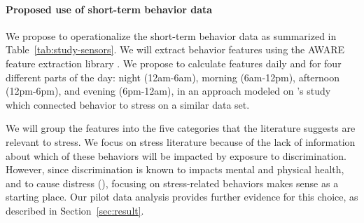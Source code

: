 \paragraph{Proposed use of short-term behavior data} We propose to operationalize the short-term behavior data as summarized in Table~\ref{tab:study-sensors}.  We will extract behavior features using  the AWARE feature extraction library \citep{Chikersal:2019}. We propose to calculate features daily and for four different parts of the day: night (12am-6am), morning (6am-12pm), afternoon (12pm-6pm), and evening (6pm-12am), in an approach modeled on \citep{wang2014studentlife}'s study which connected behavior to stress on a similar data set. 

We will group the features into  the five categories that the literature suggests are relevant to stress. We focus on stress literature because of the lack of information about which of these behaviors will be impacted by  exposure to discrimination. However, since discrimination is known to  impacts mental and physical health, and to cause distress (\eg \cite{Ong:2009}), focusing on stress-related behaviors makes sense as a starting place. Our pilot data analysis provides further evidence for this choice, as described in Section~\ref{sec:result}.

